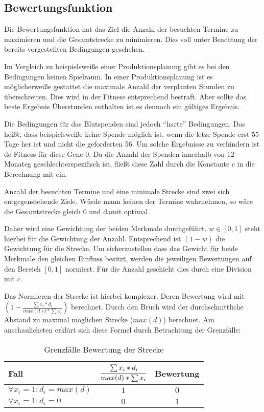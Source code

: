 \subsection{Bewertungsfunktion}
Die Bewertungsfunktion hat das Ziel die Anzahl der besuchten Termine zu maximieren und die Gesamtstrecke zu minimieren.
Dies soll unter Beachtung der bereits vorgestellten Bedingungen geschehen.

Im Vergleich zu beispielsweiße einer Produktionsplanung gibt es bei den Bedingungen keinen Spielraum.
In einer Produktionsplanung ist es möglicherweiße gestattet die maximale Anzahl der verplanten Stunden zu überschreiten.
Dies wird in der Fitness entsprechend bestraft. Aber sollte das beste Ergebnis Überstunden enthalten ist es dennoch ein gültiges Ergebnis.

Die Bedingungen für das Blutspenden sind jedoch \enquote{harte} Bedingungen.
Das heißt, dass beispielsweiße keine Spende möglich ist, wenn die letze Spende erst 55 Tage her ist und nicht die geforderten 56.
Um solche Ergebnisse zu verhindern ist de Fitness für diese Gene $0$.
Da die Anzahl der Spenden innerhalb von 12 Monateg geschlechterspezifisch ist,
fließt diese Zahl durch die Konstante $c$ in die Berechnung mit ein.

Anzahl der besuchten Termine und eine minimale Strecke sind zwei sich entgegenstehende Ziele.
Würde mann keinen der Termine wahrnehmen, so wäre die Gesamtstrecke gleich $0$ und damit optimal.

Daher wird eine Gewichtung der beiden Merkmale durchgeführt.
$w \in [0,1]$ steht hierbei für die Gewichtung der Anzahl.
Entsprechend ist $(1-w)$ die Gewichtung für die Strecke.
Um sicherzustellen dass das Gewicht für beide Merkmale den gleichen Einfluss besitzt,
werden die jeweiligen Bewertungen auf den Bereich $[0,1]$ normiert.
Für die Anzahl geschieht dies durch eine Division mit $c$.

Das Normieren der Strecke ist hierbei komplexer.
Deren Bewertung wird mit $(1 - \frac{\sum x_i * d_i}{max(d)t* \sum x_i})$ berechnet.
Durch den Bruch wird der durchschnittliche Abstand zu maximal möglichen Strecke ($max(d)$) berechnet.
Am anschaulichsten erklärt sich diese Formel durch Betrachtung der Grenzfälle:
\begin{table}[ht]%
    \begin{center}
        \begin{tabular}{l|c|c}
            Fall                            & $\cfrac{\sum x_i * d_i}{max(d) * \sum x_i}$  &  Bewertung \\
            \hline
            $\forall x_i = 1: d_i = max(d)$ & $1$                                           & $0$       \\
            $\forall x_i = 1: d_i = 0$      & $0$                                           & $1$       \\
        \end{tabular}
    \end{center}
    \caption{Grenzfälle Bewertung der Strecke}
  \end{table}

